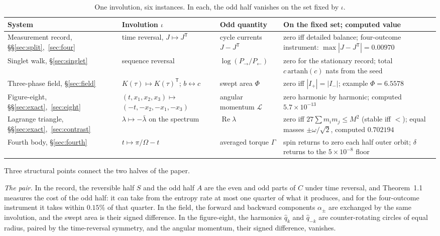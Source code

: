\documentclass[11pt]{article}
\theoremstyle{definition}\newtheorem{definition}[theorem]{Definition}
\theoremstyle{remark}\newtheorem{remark}[theorem]{Remark}
\renewcommand{\Re}{\operatorname{Re}}\renewcommand{\Im}{\operatorname{Im}}
\begin{document}
\begin{table}[!htb]\centering\small
\begin{tabular}{@{}>{\raggedright\arraybackslash}p{2.8cm}>{\raggedright\arraybackslash}p{4.1cm}>{\raggedright\arraybackslash}p{3.0cm}>{\raggedright\arraybackslash}p{4.7cm}@{}}\toprule
System & Involution $\iota$ & Odd quantity & On the fixed set; computed value\\\midrule
Measurement record, \S\S\ref{sec:split},~\ref{sec:four} & time reversal, $J\mapsto J^{\mathsf T}$ & cycle currents $J-J^{\mathsf T}$ & zero iff detailed balance; four-outcome instrument: $\max|J-J^{\mathsf T}|=0.00970$\\
Singlet walk, \S\ref{sec:singlet} & sequence reversal & $\log(P_\to/P_\leftarrow)$ & zero for the stationary record; total $c\,\mathrm{artanh}(c)$ nats from the seed\\
Three-phase field, \S\ref{sec:field} & $K(\tau)\mapsto K(\tau)^{\mathsf T}$; $b\leftrightarrow c$ & swept area $\Phi$ & zero iff $|I_+|=|I_-|$; example $\Phi=6.5578$\\
Figure-eight, \S\S\ref{sec:exact},~\ref{sec:eight} & $(t,x_1,x_2,x_3)\mapsto$ $(-t,-x_2,-x_1,-x_3)$ & angular momentum $\mathcal L$ & zero harmonic by harmonic; computed $5.7\times10^{-13}$\\
Lagrange triangle, \S\S\ref{sec:exact},~\ref{sec:contrast} & $\lambda\mapsto-\bar\lambda$ on the spectrum & $\Re\lambda$ & zero iff $27\sum m_im_j\le M^2$ (stable iff $<$); equal masses $\pm\omega/\sqrt2$, computed $0.702194$\\
Fourth body, \S\ref{sec:fourth} & $t\mapsto\pi/\Omega-t$ & averaged torque $\Gamma$ & spin returns to zero each half outer orbit; $\delta$ returns to the $5\times10^{-8}$ floor\\\bottomrule
\end{tabular}
\caption{One involution, six instances. In each, the odd half vanishes on the set fixed by $\iota$.}\label{tab:involution}
\end{table}

Three structural points connect the two halves of the paper.

\emph{The pair.} In the record, the reversible half $S$ and the odd half $A$ are the even and odd parts of $C$ under time reversal, and Theorem~1.1 measures the cost of the odd half: it can take from the entropy rate at most one quarter of what it produces, and for the four-outcome instrument it takes within $0.15\%$ of that quarter. In the field, the forward and backward components $\alpha_\pm$ are exchanged by the same involution, and the swept area is their signed difference. In the figure-eight, the harmonics $\hat q_k$ and $\hat q_{-k}$ are counter-rotating circles of equal radius, paired by the time-reversal symmetry, and the angular momentum, their signed difference, vanishes.
\end{document}
